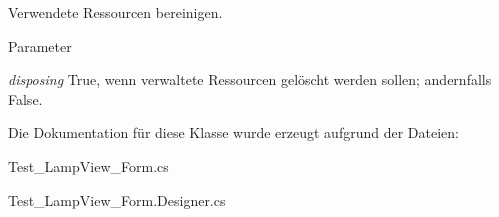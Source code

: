 Verwendete Ressourcen bereinigen. 


\begin{DoxyParams}{Parameter}
\item[{\em disposing}]True, wenn verwaltete Ressourcen gelöscht werden sollen; andernfalls False.\end{DoxyParams}


Die Dokumentation für diese Klasse wurde erzeugt aufgrund der Dateien:\begin{DoxyCompactItemize}
\item 
Test\_\-LampView\_\-Form.cs\item 
Test\_\-LampView\_\-Form.Designer.cs\end{DoxyCompactItemize}

